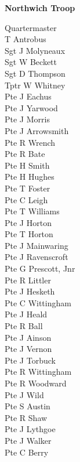 \vspace*{10mm}

\begin{center}
  \Large
  \textbf{Northwich Troop}
\end{center}

\begin{multicols}{3}
  \small
  \noindent
  Quartermaster \\ \indent T Antrobus \\
  Sgt J Molyneaux \\
  Sgt W Beckett \\
  Sgt D Thompson \\
  Tptr W Whitney \\
  Pte J Eachus \\
  Pte J Yarwood \\
  Pte J Morris \\
  Pte J Arrowsmith \\
  Pte R Wrench \\
  Pte R Bate \\
  Pte H Smith \\
  Pte H Hughes \\
  Pte T Foster \\
  Pte C Leigh \\
  Pte T Williams \\
  Pte J Horton \\
  Pte T Horton \\
  Pte J Mainwaring \\
  Pte J Ravenscroft \\
  Pte G Prescott, Jnr \\
  Pte R Littler \\
  Pte J Hesketh \\
  Pte C Wittingham \\
  Pte J Heald \\
  Pte R Ball \\
  Pte J Ainson \\
  Pte J Vernon \\
  Pte J Torbuck \\
  Pte R Wittingham \\
  Pte R Woodward \\
  Pte J Wild \\
  Pte S Austin \\
  Pte R Shaw \\
  Pte J Lythgoe \\
  Pte J Walker \\
  Pte C Berry \\

\end{multicols}
